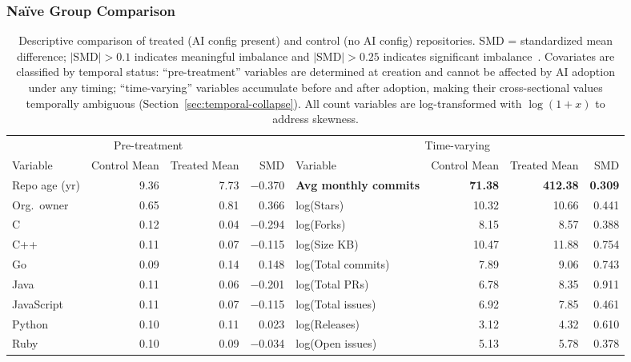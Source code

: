 \subsubsection{Na\"ive Group Comparison}
\label{sec:naive-comparison}

\begin{table}[t]
  \centering
  \begin{threeparttable}
  \caption{Descriptive comparison of treated (AI config present) and control (no AI config) repositories.
  SMD = standardized mean difference; $|\text{SMD}| > 0.1$ indicates meaningful imbalance and $|\text{SMD}| > 0.25$ indicates significant imbalance~\cite{austin2009balance}.
  Covariates are classified by temporal status: ``pre-treatment'' variables are determined at creation and cannot be affected by AI adoption under any timing; ``time-varying'' variables accumulate before and after adoption, making their cross-sectional values temporally ambiguous (Section~\ref{sec:temporal-collapse}).
  All count variables are log-transformed with $\log(1+x)$ to address skewness.}
  \label{tab:descriptive}
  \small
  \begin{tabular}{lrrrlrrr}
  \toprule
  \multicolumn{4}{c}{Pre-treatment\tnote{a}} & \multicolumn{4}{c}{Time-varying} \\
  \cmidrule(r){1-4} \cmidrule(l){5-8}
  Variable & Control Mean & Treated Mean & SMD & Variable & Control Mean & Treated Mean & SMD \\
  \midrule
  Repo age (yr) & 9.36 & 7.73 & $-$0.370 & \textbf{Avg monthly commits} & \textbf{71.38} & \textbf{412.38} & \textbf{0.309} \\
  Org.\ owner\tnote{b} & 0.65 & 0.81 & 0.366 & log(Stars) & 10.32 & 10.66 & 0.441 \\
  C & 0.12 & 0.04 & $-$0.294 & log(Forks) & 8.15 & 8.57 & 0.388 \\
  C++ & 0.11 & 0.07 & $-$0.115 & log(Size KB) & 10.47 & 11.88 & 0.754 \\
  Go & 0.09 & 0.14 & 0.148 & log(Total commits) & 7.89 & 9.06 & 0.743 \\
  Java & 0.11 & 0.06 & $-$0.201 & log(Total PRs) & 6.78 & 8.35 & 0.911 \\
  JavaScript & 0.11 & 0.07 & $-$0.115 & log(Total issues) & 6.92 & 7.85 & 0.461 \\
  Python & 0.10 & 0.11 & 0.023 & log(Releases) & 3.12 & 4.32 & 0.610 \\
  Ruby & 0.10 & 0.09 & $-$0.034 & log(Open issues) & 5.13 & 5.78 & 0.378 \\

\end{tabular}
\end{threeparttable}
\end{table}
